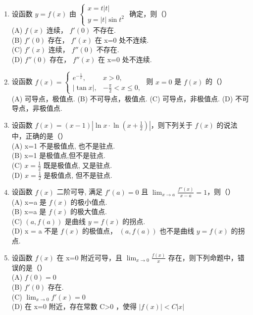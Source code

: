 \documentclass[12pt, a4paper]{ctexart}
\begin{document}
\begin{enumerate}
    \item 设函数 $ y = f(x) $ 由 $ \begin{cases} x = t |t| \\ y = |t| \sin t^2 \end{cases} $ 确定，则（）\\
    (A) $ f(x) $ 连续， $ f'(0) $ 不存在.\\
    (B) $ f'(0) $ 存在， $ f'(x) $ 在 x=0 处不连续.\\
    (C) $ f'(x) $ 连续， $ f''(0) $ 不存在.\\
    (D) $ f''(0) $ 存在， $ f''(x) $ 在 x=0 处不连续.

    \item 设函数 $ f(x) = \begin{cases} e^{-\frac{1}{x}}, & x > 0, \\ |\tan x|, & -\frac{\pi}{2} < x \leq 0, \end{cases} $ 则 $ x = 0 $ 是 $ f(x) $ 的（）\\
    (A) 可导点，极值点. (B) 不可导点，极值点. (C) 可导点，非极值点. (D) 不可导点，非极值点.

    \item 设函数 $ f(x) = (x - 1) \left| \ln x \cdot \ln \left( x + \frac{1}{2} \right) \right| $，则下列关于 $ f(x) $ 的说法中，正确的是（）\\
    (A) x=1 不是极值点, 也不是驻点.\\
    (B) x=1 是极值点,但不是驻点.\\
    (C) $ x = \frac{1}{2} $ 既是极值点, 又是驻点.\\
    (D) $ x = \frac{1}{2} $ 是极值点, 但不是驻点.

    \item 设函数 $ f(x) $ 二阶可导, 满足 $ f'(a) = 0 $ 且 $ \lim_{x \to a} \frac{f''(x)}{x - a} = 1 $，则（）\\
    (A) x=a 是 $ f(x) $ 的极小值点.\\
    (B) x=a 是 $ f(x) $ 的极大值点.\\
    (C) $ (a, f(a)) $ 是曲线 $ y = f(x) $ 的拐点.\\
    (D) x = a 不是 $ f(x) $ 的极值点， $ (a, f(a)) $ 也不是曲线 $ y = f(x) $ 的拐点.

    \item 设函数 $ f(x) $ 在 x=0 附近可导，且 $ \lim_{x\to0}\frac{f(x)}{x} $ 存在，则下列命题中，错误的是（）\\
    (A) $ f(0)=0 $\\
    (B) $ f'(0) $ 存在.\\
    (C) $ \lim_{x\to0}f'(x)=0 $\\
    (D) 在 x=0 附近，存在常数 C>0 ，使得 $ \left|f(x)\right|<C|x| $


\end{enumerate}
\end{document}
